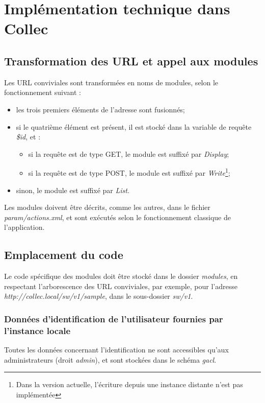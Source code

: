 \chapter{Implémentation technique dans Collec}
\section{Transformation des URL et appel aux modules}
Les URL conviviales sont transformées en noms de modules, selon le fonctionnement suivant :
\begin{itemize}
\item les trois premiers éléments de l'adresse sont fusionnés;
\item si le quatrième élément est présent, il est stocké dans la variable de requête \textit{\$id}, et :
\begin{itemize}
\item si la requête est de type GET, le module est suffixé par \textit{Display};
\item si la requête est de type POST, le module est suffixé par \textit{Write}\footnote{Dans la version actuelle, l'écriture depuis une instance distante n'est pas implémentée};
\end{itemize}
\item sinon, le module est suffixé par \textit{List}.
\end{itemize}

Les modules doivent être décrits, comme les autres, dans le fichier \textit{param/actions.xml}, et sont exécutés selon le fonctionnement classique de l'application.

\section{Emplacement du code}
Le code spécifique des modules doit être stocké dans le dossier \textit{modules}, en respectant l'arborescence des URL conviviales, par exemple, pour l'adresse \textit{http://collec.local/sw/v1/sample}, dans le sous-dossier \textit{sw/v1}.

\subsection{Données d'identification de l'utilisateur fournies par l'instance locale}
\label{table_user}

Toutes les données concernant l'identification ne sont accessibles qu'aux administrateurs (droit \textit{admin}), et sont stockées dans le schéma \textit{gacl}.


